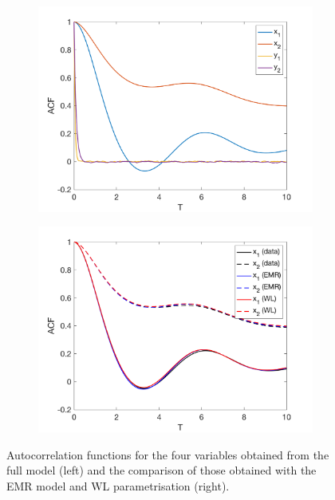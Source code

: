 \documentclass[12pt]{article}
\begin{document}
\begin{figure}[H]
	\centering
	\begin{subfigure}[b]{0.49\textwidth}
		\centering
		\includegraphics[width=\textwidth]{plots/climate_model/h01/acf_data_05_01.png}
	\end{subfigure}
	\begin{subfigure}[b]{0.49\textwidth}
		\centering
		\includegraphics[width=\textwidth]{plots/climate_model/h01/acf_e05_h01.png}
	\end{subfigure}
	\caption{\label{correlations 1}Autocorrelation functions for the four variables obtained from the full model (left) and the comparison of those obtained with the EMR model and WL parametrisation (right).}
\end{figure}
\end{document}
